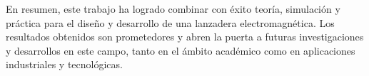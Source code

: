 En resumen, este trabajo ha logrado combinar con éxito teoría, simulación y práctica para el diseño y desarrollo de una lanzadera electromagnética. Los resultados obtenidos son prometedores y abren la puerta a futuras investigaciones y desarrollos en este campo, tanto en el ámbito académico como en aplicaciones industriales y tecnológicas.